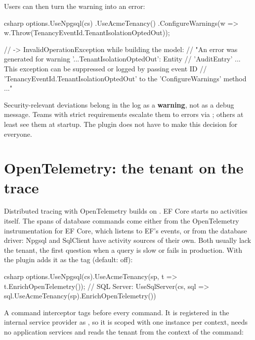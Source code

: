 Users can then turn the warning into an error:

\begin{sourcecode}[Usage]{csharp}
options.UseNpgsql(cs)
       .UseAcmeTenancy()
       .ConfigureWarnings(w => w.Throw(TenancyEventId.TenantIsolationOptedOut));

// -> InvalidOperationException while building the model:
//    "An error was generated for warning '...TenantIsolationOptedOut': Entity
//     'AuditEntry' ... This exception can be suppressed or logged by passing event ID
//     'TenancyEventId.TenantIsolationOptedOut' to the 'ConfigureWarnings' method ..."
\end{sourcecode}

\begin{tip}
  Security-relevant deviations belong in the log as a \textbf{warning}, not as a debug
  message. Teams with strict requirements escalate them to errors via
  ; others at least see them at startup. The plugin
  does not have to make this decision for everyone.
\end{tip}

\section{OpenTelemetry: the tenant on the trace}

Distributed tracing with OpenTelemetry builds on
. EF Core starts no activities
itself. The spans of database commands come either from the OpenTelemetry instrumentation for
EF Core, which listens to EF's  events, or from the
database driver: Npgsql and SqlClient have activity sources of their own. Both usually lack the
tenant, the first question when a query is slow or fails in production. With
 the plugin adds it as the tag
 (default: off):

\begin{sourcecode}[Usage]{csharp}
options.UseNpgsql(cs).UseAcmeTenancy(sp, t => t.EnrichOpenTelemetry());
// SQL Server: UseSqlServer(cs, sql => sql.UseAcmeTenancy(sp).EnrichOpenTelemetry())
\end{sourcecode}

A command interceptor tags  before every command. It is
registered in the internal service provider as , so it is scoped with one
instance per context, needs no application services and reads the tenant from the context of
the command:

